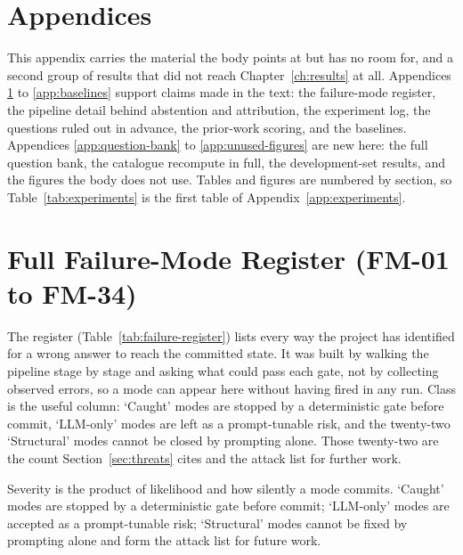 \chapter*{Appendices}

This appendix carries the material the body points at but has no room for, and a second group of results that did not reach Chapter~\ref{ch:results} at all. Appendices \ref{app:failure-register} to \ref{app:baselines} support claims made in the text: the failure-mode register, the pipeline detail behind abstention and attribution, the experiment log, the questions ruled out in advance, the prior-work scoring, and the baselines. Appendices \ref{app:question-bank} to \ref{app:unused-figures} are new here: the full question bank, the catalogue recompute in full, the development-set results, and the figures the body does not use. Tables and figures are numbered by section, so Table~\ref{tab:experiments} is the first table of Appendix~\ref{app:experiments}.

\chapter{Full Failure-Mode Register (FM-01 to FM-34)}\label{app:failure-register}

The register (Table~\ref{tab:failure-register}) lists every way the project has identified for a wrong answer to reach the committed state. It was built by walking the pipeline stage by stage and asking what could pass each gate, not by collecting observed errors, so a mode can appear here without having fired in any run. Class is the useful column: `Caught' modes are stopped by a deterministic gate before commit, `LLM-only' modes are left as a prompt-tunable risk, and the twenty-two `Structural' modes cannot be closed by prompting alone. Those twenty-two are the count Section~\ref{sec:threats} cites and the attack list for further work.

Severity is the product of likelihood and how silently a mode commits. `Caught' modes are stopped by a deterministic gate before commit; `LLM-only' modes are accepted as a prompt-tunable risk; `Structural' modes cannot be fixed by prompting alone and form the attack list for future work.

